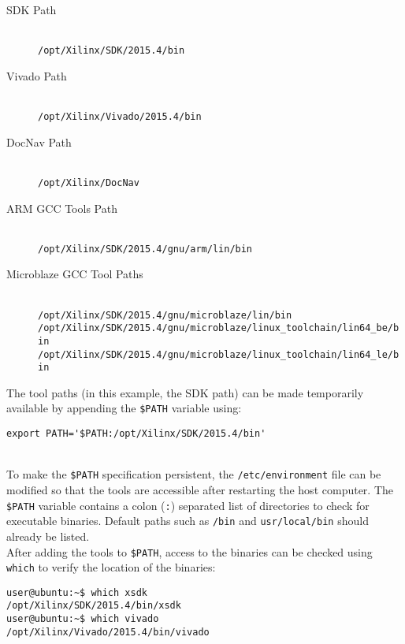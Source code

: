 \begin{description}
	\item[SDK Path] \hfill \\
		\texttt{/opt/Xilinx/SDK/2015.4/bin}
	\item[Vivado Path] \hfill \\
		\texttt{/opt/Xilinx/Vivado/2015.4/bin}
	\item[DocNav Path] \hfill \\
		\texttt{/opt/Xilinx/DocNav}
	\item[ARM GCC Tools Path] \hfill \\
		\texttt{/opt/Xilinx/SDK/2015.4/gnu/arm/lin/bin}
	\item[Microblaze GCC Tool Paths] \hfill \\
	    \texttt{/opt/Xilinx/SDK/2015.4/gnu/microblaze/lin/bin} \\
		\texttt{/opt/Xilinx/SDK/2015.4/gnu/microblaze/linux\_toolchain/lin64\_be/bin} \\
		\texttt{/opt/Xilinx/SDK/2015.4/gnu/microblaze/linux\_toolchain/lin64\_le/bin}
\end{description}

\noindent
The tool paths (in this example, the SDK path) can be made temporarily available by appending the \texttt{\$PATH} variable using: \\

\begin{lstlisting}
export PATH='$PATH:/opt/Xilinx/SDK/2015.4/bin'
\end{lstlisting}

~\\
\noindent
To make the \texttt{\$PATH} specification persistent, the \texttt{/etc/environment} file can be modified so that the tools are accessible after restarting the host computer. The \texttt{\$PATH} variable contains a colon (\texttt{:}) separated list of directories to check for executable binaries. Default paths such as \texttt{/bin} and \texttt{usr/local/bin} should already be listed. \\

\noindent
After adding the tools to \texttt{\$PATH}, access to the binaries can be checked using \texttt{which} to verify the location of the binaries: \\

\begin{lstlisting}
user@ubuntu:~$ which xsdk
/opt/Xilinx/SDK/2015.4/bin/xsdk
user@ubuntu:~$ which vivado
/opt/Xilinx/Vivado/2015.4/bin/vivado
\end{lstlisting}


